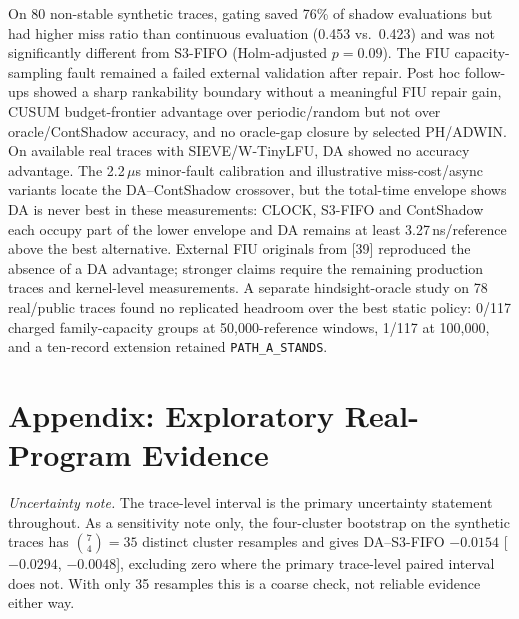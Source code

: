 \documentclass[10pt,twocolumn,a4paper]{IEEEtran}
\begin{document}
On 80 non-stable synthetic traces, gating saved 76\% of shadow evaluations
but had higher miss ratio than continuous evaluation (0.453 vs.\ 0.423) and
was not significantly different from S3-FIFO (Holm-adjusted $p=0.09$). The FIU
capacity-sampling fault remained a failed external validation after repair.
Post hoc follow-ups showed a sharp rankability boundary without a
meaningful FIU repair gain, CUSUM budget-frontier advantage over
periodic/random but not over oracle/ContShadow accuracy, and no oracle-gap
closure by selected PH/ADWIN. On available real traces with SIEVE/W-TinyLFU,
DA showed no accuracy advantage. The 2.2\,$\mu$s minor-fault calibration and
illustrative miss-cost/async variants locate the DA--ContShadow crossover, but
the total-time envelope shows DA is never best in these measurements: CLOCK,
S3-FIFO and ContShadow each occupy part of the lower envelope and DA remains
at least 3.27\,ns/reference above the best alternative. External FIU originals
from [39] reproduced the absence of a DA advantage; stronger claims require the
remaining production traces and kernel-level measurements. A separate
hindsight-oracle study on 78 real/public traces found no replicated headroom
over the best static policy: 0/117 charged family-capacity groups at
50{,}000-reference windows, 1/117 at 100{,}000, and a ten-record extension
retained \texttt{PATH\_A\_STANDS}.

\section*{Appendix: Exploratory Real-Program Evidence}

\emph{Uncertainty note.} The trace-level interval is the primary uncertainty
statement throughout. As a sensitivity note only, the four-cluster bootstrap
on the synthetic traces has $\binom{7}{4} = 35$ distinct cluster resamples and
gives DA--S3-FIFO $-0.0154$ [$-0.0294$, $-0.0048$], excluding zero where the
primary trace-level paired interval does not. With only 35 resamples this is a
coarse check, not reliable evidence either way.
\end{document}
